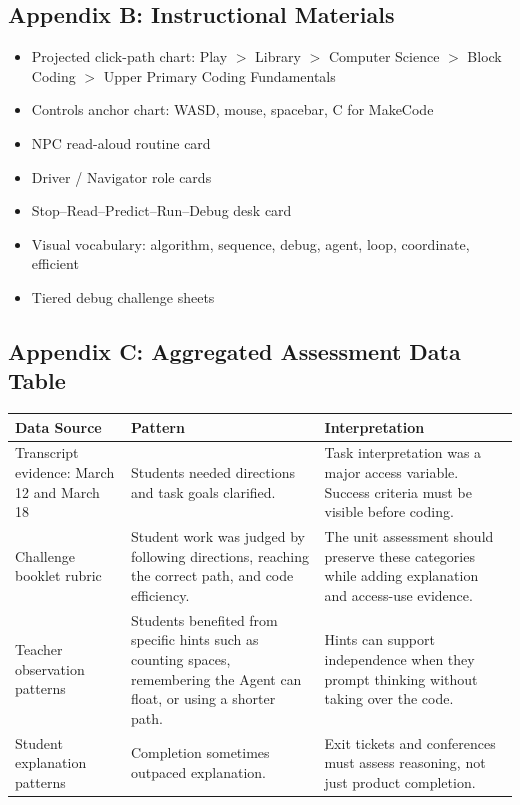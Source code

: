 \documentclass[12pt]{article}
\newcommand{\arow}{\rowcolor{altRow}}
\begin{document}
\subsection{Appendix B: Instructional Materials}
\begin{itemize}
\item Projected click-path chart: Play $>$ Library $>$ Computer Science $>$ Block Coding $>$ Upper Primary Coding Fundamentals
\item Controls anchor chart: WASD, mouse, spacebar, C for MakeCode
\item NPC read-aloud routine card
\item Driver / Navigator role cards
\item Stop--Read--Predict--Run--Debug desk card
\item Visual vocabulary: algorithm, sequence, debug, agent, loop, coordinate, efficient
\item Tiered debug challenge sheets
\end{itemize}

\subsection{Appendix C: Aggregated Assessment Data Table}
\begin{tabularx}{\textwidth}{|P{1.7in}|P{1.3in}|L|}
\hline
{}\color{white}\bfseries Data Source & \color{white}\bfseries Pattern & \color{white}\bfseries Interpretation \\
\hline
Transcript evidence: March 12 and March 18 & Students needed directions and task goals clarified. & Task interpretation was a major access variable. Success criteria must be visible before coding. \\
\hline
\arow Challenge booklet rubric & Student work was judged by following directions, reaching the correct path, and code efficiency. & The unit assessment should preserve these categories while adding explanation and access-use evidence. \\
\hline
Teacher observation patterns & Students benefited from specific hints such as counting spaces, remembering the Agent can float, or using a shorter path. & Hints can support independence when they prompt thinking without taking over the code. \\
\hline
Student explanation patterns & Completion sometimes outpaced explanation. & Exit tickets and conferences must assess reasoning, not just product completion. \\
\hline
\end{tabularx}
\end{document}
